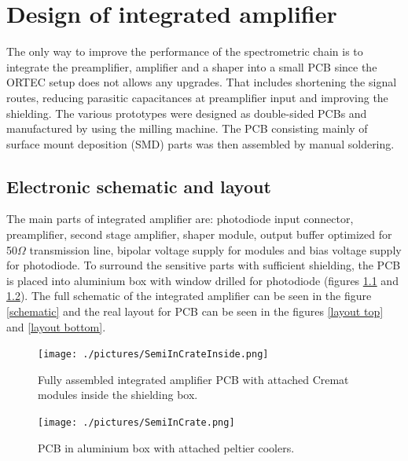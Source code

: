 \chapter{Design of integrated amplifier}

The only way to improve the performance of the spectrometric chain is to integrate the preamplifier, amplifier and a shaper into a small PCB since the ORTEC setup does not allows any upgrades. That includes shortening the signal routes, reducing parasitic capacitances at preamplifier input and improving the shielding. The various prototypes were designed as double-sided PCBs and manufactured by using the milling machine. The PCB consisting mainly of surface mount deposition (SMD) parts was then assembled by manual soldering.

\section{Electronic schematic and layout}
The main parts of integrated amplifier are: photodiode input connector, preamplifier, second stage amplifier, shaper module, output buffer optimized for 50\nobreakspace$\Omega$ transmission line, bipolar voltage supply for modules and bias voltage supply for photodiode. To surround the sensitive parts with sufficient shielding, the PCB is placed into aluminium box with window drilled for photodiode (figures \ref{PCBbox} and \ref{PCBphyss}). The full schematic of the integrated amplifier can be seen in the figure \ref{schematic} and the real layout for PCB can be seen in the figures \ref{layout top} and \ref{layout bottom}.



\begin{figure}[H]
 \centering
 \texttt{[image: ./pictures/SemiInCrateInside.png]}
 \caption{Fully assembled integrated amplifier PCB with attached Cremat modules inside the shielding box.}
 \label{PCBbox}
 
\end{figure}


\begin{figure}[H]
 \centering
 \texttt{[image: ./pictures/SemiInCrate.png]}
 \caption{PCB in aluminium box with attached peltier coolers.}
 \label{PCBphyss}
 
\end{figure}



\newpage

